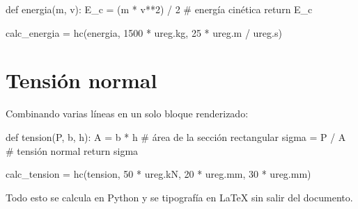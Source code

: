 \documentclass[11pt]{article}
\begin{document}
def energia(m, v):
    E_c = (m * v**2) / 2       # energía cinética
    return E_c

calc_energia = hc(energia, 1500 * ureg.kg, 25 * ureg.m / ureg.s)


\section{Tensión normal}
Combinando varias líneas en un solo bloque renderizado:

def tension(P, b, h):
    A = b * h          # área de la sección rectangular
    sigma = P / A      # tensión normal
    return sigma

calc_tension = hc(tension, 50 * ureg.kN, 20 * ureg.mm, 30 * ureg.mm)


\medskip
Todo esto se calcula en Python y se tipografía en \LaTeX{} sin salir del documento.
\end{document}
